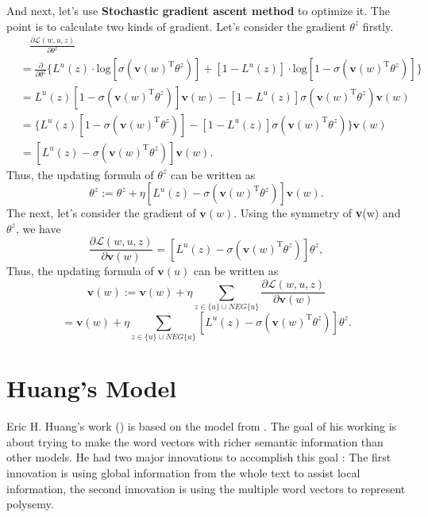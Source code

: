 And next, let's use \textbf{Stochastic gradient ascent method} to optimize it. The point is to calculate two kinds of gradient. Let's consider the gradient $\theta^z$ firstly.
\begin{align*}
& \ \ \ \ \frac{\partial\mathcal{L}(w,u,z)}{\partial\theta^z} \\
& =  \frac{\partial}{\partial\theta^z} \{ L^u(z)\cdot \mathrm{log}[\sigma(\mathbf{v}(w)^{\mathrm{T}}\theta^z)]+[1-L^u(z)]\cdot\mathrm{log}[1-\sigma(\mathbf{v}(w)^{\mathrm{T}}\theta^z)] \} \\
& =  L^u(z)[1-\sigma(\mathbf{v}(w)^{\mathrm{T}}\theta^z)]\mathbf{v}(w) - [1-L^u(z)]\sigma(\mathbf{v}(w)^{\mathrm{T}}\theta^z)\mathbf{v}(w) \\
& = \{L^u(z)[1-\sigma(\mathbf{v}(w)^{\mathrm{T}}\theta^z)]-[1-L^u(z)]\sigma(\mathbf{v}(w)^{\mathrm{T}}\theta^z)\}\mathbf{v}(w) \\
& = [L^u(z)-\sigma(\mathbf{v}(w)^{\mathrm{T}}\theta^z)] \mathbf{v}(w).
\end{align*}
Thus, the updating formula of $\theta^z$ can be written as
$$\theta^z:=\theta^z+\eta[L^u(z)-\sigma(\mathbf{v}(w)^{\mathrm{T}}\theta^z)]\mathbf{v}(w).$$
The next, let's consider the gradient of $\mathbf{v}(w)$. Using the symmetry of \textbf{v}(w) and $\theta^z$, we have
$$\frac{\partial\mathcal{L}(w,u,z)}{\partial\mathbf{v}(w)} = [L^u(z)-\sigma(\mathbf{v}(w)^{\mathrm{T}}\theta^z)]\theta^z,$$
Thus, the updating formula of $\mathbf{v}(u)$ can be written as 
$$\mathbf{v}(w):=\mathbf{v}(w)+\eta\sum_{z\in\{u\}\cup NEG\{u\}}\frac{\partial\mathcal{L}(w,u,z)}{\partial\mathbf{v}(w)}$$
$$=\mathbf{v}(w)+\eta\sum_{z\in\{u\}\cup NEG\{u\}}[L^u(z)-\sigma(\mathbf{v}(w)^{\mathrm{T}}\theta^z)]\theta^z.$$

\section{Huang's Model}


Eric H. Huang's work (\cite{huang2012improving}) is based on the model from \cite{collobert2008unified}. The goal of his working is about trying to make the word vectors with richer semantic information than other models. He had two major innovations to accomplish this goal : The first innovation is using global information from the whole text to assist local information, the second innovation is using the multiple word vectors to represent polysemy. \\

